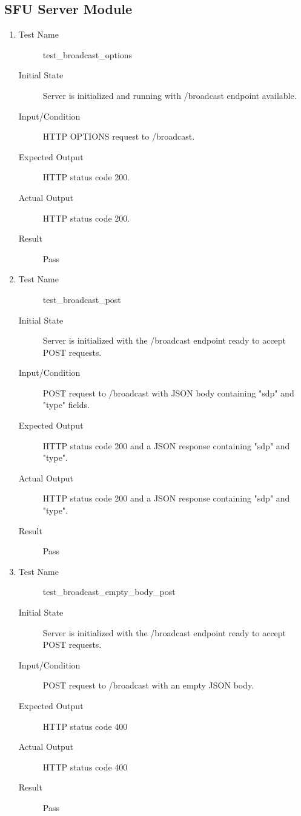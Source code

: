\documentclass[12pt, titlepage]{article}
\begin{document}
\subsection{SFU Server Module}
\begin{enumerate}[UT-S1]
    \item \label{UT-S1}
    \begin{description}
    \item[Test Name] test\_broadcast\_options
    \item[Initial State] Server is initialized and running with /broadcast endpoint available.
    \item[Input/Condition] HTTP OPTIONS request to /broadcast.
    \item[Expected Output] HTTP status code 200.
    \item[Actual Output] HTTP status code 200.
    \item[Result] Pass
    \end{description}

    \item \label{UT-S2}
    \begin{description}
    \item[Test Name] test\_broadcast\_post
    \item[Initial State] Server is initialized with the /broadcast endpoint ready to accept POST requests.
    \item[Input/Condition] POST request to /broadcast with JSON body containing "sdp" and "type" fields.
    \item[Expected Output] HTTP status code 200 and a JSON response containing "sdp" and "type".
    \item[Actual Output] HTTP status code 200 and a JSON response containing "sdp" and "type".
    \item[Result] Pass
    \end{description}

    \item \label{UT-S3}
    \begin{description}
    \item[Test Name] test\_broadcast\_empty\_body\_post
    \item[Initial State] Server is initialized with the /broadcast endpoint ready to accept POST requests.
    \item[Input/Condition] POST request to /broadcast with an empty JSON body.
    \item[Expected Output] HTTP status code 400
    \item[Actual Output] HTTP status code 400
    \item[Result] Pass
    \end{description}


\end{enumerate}
\end{document}
